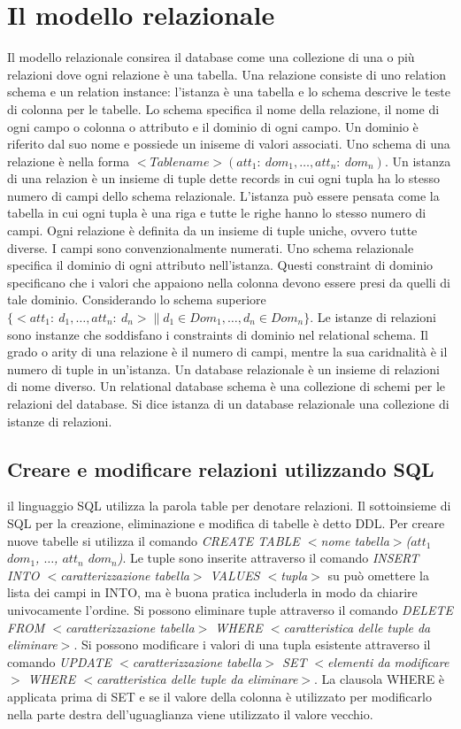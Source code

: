 \chapter{Il modello relazionale}
Il modello relazionale consirea il database come una collezione di una o pi\`u relazioni dove ogni relazione \`e una tabella. Una relazione consiste di uno relation schema e un relation instance: l'istanza \`e una 
tabella e lo schema descrive le teste di colonna per le tabelle. Lo schema specifica il nome della relazione, il nome di ogni campo o colonna o attributo e il dominio di ogni campo. Un dominio \`e riferito dal suo 
nome e possiede un iniseme di valori associati. Uno schema di una relazione \`e nella forma $<Table name>(att_1:\ dom_1, \dots, att_n:\ dom_n)$. Un istanza di una relazion \`e un insieme di tuple dette records 
in cui ogni tupla ha lo stesso numero di campi dello schema relazionale.  L'istanza pu\`o essere pensata come la tabella in cui ogni tupla \`e una riga e tutte le righe hanno lo stesso numero di campi. Ogni 
relazione \`e definita da un insieme di tuple uniche, ovvero tutte diverse. I campi sono convenzionalmente numerati. Uno schema relazionale specifica il dominio di ogni attributo nell'istanza. Questi constraint di 
dominio specificano che i valori che appaiono nella colonna devono essere presi da quelli di tale dominio. Considerando lo schema superiore $\{<att_1:\ d_1, \dots, att_n:\ d_n>\|d_1\in Dom_1, \dots, d_n\in 
Dom_n\}$. Le istanze di relazioni sono instanze che soddisfano i constraints di dominio nel relational schema. Il grado o arity di una relazione \`e il numero di campi, mentre la sua caridnalit\`a \`e il numero di 
tuple in un'istanza. Un database relazionale \`e un insieme di relazioni di nome diverso. Un relational database schema \`e una collezione di schemi per le relazioni del database. Si dice istanza di un database 
relazionale una collezione di istanze di relazioni.
\section{Creare e modificare relazioni utilizzando SQL}
il linguaggio SQL utilizza la parola table per denotare relazioni. Il sottoinsieme di SQL per la creazione, eliminazione e modifica di tabelle \`e detto DDL. Per creare nuove tabelle si utilizza il comando 
\emph{CREATE TABLE $<$nome tabella$>$($att_1$  $dom_1$, $\dots$, $att_n$  $dom_n$)}. Le tuple sono inserite attraverso il comando \emph{INSERT INTO $<$caratterizzazione tabella$>$ VALUES 
$<$tupla$>$} su pu\`o omettere la lista dei campi in INTO, ma \`e buona pratica includerla in modo da chiarire univocamente l'ordine. Si possono eliminare tuple attraverso il comando \emph{DELETE FROM 
$<$caratterizzazione tabella$>$ WHERE $<$caratteristica delle tuple da eliminare$>$}. Si possono modificare i valori di una tupla esistente attraverso il comando \emph{UPDATE  $<$caratterizzazione 
tabella$>$ SET $<$elementi da modificare$>$ WHERE $<$caratteristica delle tuple da eliminare$>$}. La clausola WHERE \`e applicata prima di SET e se il valore della colonna \`e utilizzato per modificarlo 
nella parte destra dell'uguaglianza viene utilizzato il valore vecchio. 
